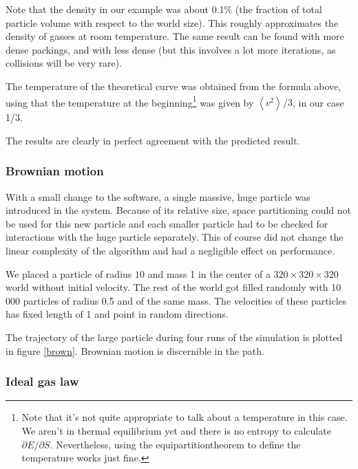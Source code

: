 Note that the density in our example was about 0.1\% (the fraction of total 
particle volume with respect to the world size). This roughly approximates 
the density of gasses at room temperature. The same result can be found 
with more dense packings, and with less dense (but this involves a lot more 
iterations, as collisions will be very rare).

The temperature of the theoretical curve was obtained from the formula 
above, using that the temperature at the beginning\footnote{Note that it's 
not quite appropriate to talk about a temperature in this case. We aren't 
in thermal equilibrium yet and there is no entropy to calculate $\partial E 
/ \partial S$. Nevertheless, using the equipartitiontheorem to define the 
temperature works just fine.}
was given by $\left<v^2\right>/3$, in our case 1/3.

The results are clearly in perfect agreement with the predicted result.


\subsubsection{Brownian motion}
With a small change to the software, a single massive, huge particle was 
introduced in the system. Because of its relative size, space partitioning 
could not be used for this new particle and each smaller particle had to be 
checked for interactions with the huge particle separately. This of course 
did not change the linear complexity of the algorithm and had a negligible 
effect on performance.

We placed a particle of radius $10$ and mass 1 in the center of a $320 
\times 320 \times 320$ world without initial velocity. The rest of the 
world got filled randomly with 10\,000 particles of radius 0.5 and of the 
same mass. The velocities of these particles has fixed length of 1 and
point in random directions.

The trajectory of the large particle during four runs of the simulation is 
plotted in figure \ref{brown}. Brownian motion is discernible in the path.


\subsubsection{Ideal gas law}

